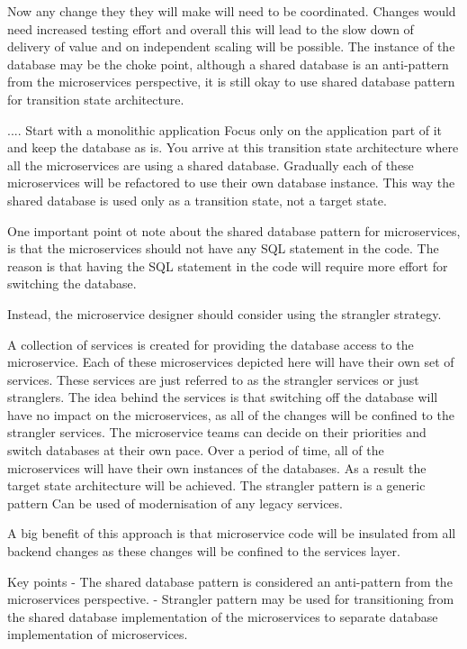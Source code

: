 \documentclass[a4paper, 11pt]{book}
\begin{document}
    Now any change they they will make will need to be coordinated.
    Changes would need increased testing effort and overall this will lead to the slow down of delivery of value and on independent scaling will be possible.
    The instance of the database may be the choke point, although a shared database is an anti-pattern from the microservices perspective, it is still okay to use shared database pattern for transition state architecture.

    ....
    Start with a monolithic application
    Focus only on the application part of it and keep the database as is.
    You arrive at this transition state architecture where all the microservices are using a shared database.
    Gradually each of these microservices will be refactored to use their own database instance.
    This way the shared database is used only as a transition state, not a target state.

    One important point ot note about the shared database pattern for microservices, is that the microservices should not have any SQL statement in the code.
    The reason is that having the SQL statement in the code will require more effort for switching the database.

    Instead, the microservice designer should consider using the strangler strategy.

    A collection of services is created for providing the database access to the microservice.
    Each of these microservices depicted here will have their own set of services.
    These services are just referred to as the strangler services or just stranglers.
    The idea behind the services is that switching off the database will have no impact on the microservices, as all of the changes will be confined to the strangler services.
    The microservice teams can decide on their priorities and switch databases at their own pace.
    Over a period of time, all of the microservices will have their own instances of the databases.
    As a result the target state architecture will be achieved.
    The strangler pattern is a generic pattern
    Can be used of modernisation of any legacy services.

    A big benefit of this approach is that microservice code will be insulated from all backend changes as these changes will be confined to the services layer.

    Key points
    - The shared database pattern is considered an anti-pattern from the microservices perspective.
    - Strangler pattern may be used for transitioning from the shared database implementation of the microservices to separate database implementation of microservices.
\end{document}
